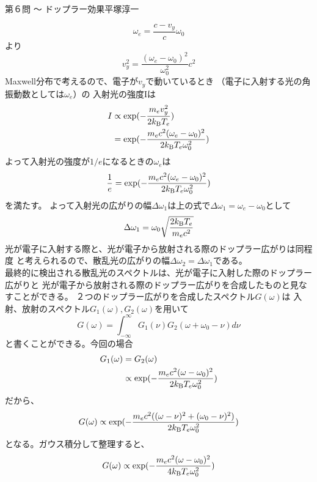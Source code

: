 \begin{answer}{第６問 〜 ドップラー効果}{平塚淳一}
\begin{enumerate}
\begin{equation}
  \omega_e=\frac{c-v_y}{c}\omega_0
  \end{equation}
  より
  \begin{equation}
  v^2_y=\frac{(\omega_e-\omega_0)^2}{\omega^2_0}c^2
  \end{equation}
  Maxwell分布で考えるので、電子が$v_y$で動いているとき
  （電子に入射する光の角振動数としては$\omega_e$）の
  入射光の強度Iは
  \begin{align}
  I &\propto \exp(-\frac{m_e v^2_y}{2k_{\mathrm B} T_e})\\
  &= \exp(-\frac{m_e c^2(\omega_e-\omega_0)^2}{2k_{\mathrm B} T_e \omega^2_0})
  \end{align}
  よって入射光の強度が$1/e$になるときの$\omega_e$は
  \begin{equation}
  \frac{1}{e}=\exp(-\frac{m_e c^2(\omega_e-\omega_0)^2}{2k_{\mathrm B} T_e \omega^2_0})
  \end{equation}
  を満たす。
  よって入射光の広がりの幅$\Delta \omega_1$は上の式で$\Delta \omega_1= \omega_e-\omega_0$として
  \begin{equation}
  \Delta \omega_1 = \omega_0\sqrt{\frac{2k_{\mathrm B} T_e}{m_ec^2}}
  \end{equation}
  光が電子に入射する際と、光が電子から放射される際のドップラー広がりは同程度
  と考えられるので、散乱光の広がりの幅$\Delta \omega_2=\Delta \omega_1$である。\\
  最終的に検出される散乱光のスペクトルは、光が電子に入射した際のドップラー広がりと
  光が電子から放射される際のドップラー広がりを合成したものと見なすことができる。
  ２つのドップラー広がりを合成したスペクトル$G(\omega)$は
  入射、放射のスペクトル$G_1(\omega),G_2(\omega)$を用いて
  \begin{equation}
  G(\omega)=\int^{\infty}_{-\infty}G_1(\nu)G_2(\omega+\omega_0-\nu)d\nu
  \end{equation}
  と書くことができる。今回の場合
  \begin{align}
  G_1(\omega)&=G_2(\omega)\\
  &\propto \exp(-\frac{m_e c^2(\omega-\omega_0)^2}{2k_{\mathrm B} T_e \omega^2_0})
  \end{align}
  だから、
  \begin{equation}
  G(\omega) \propto \exp(-\frac{m_e c^2((\omega-\nu)^2+(\omega_0-\nu)^2)}{2k_{\mathrm B} T_e \omega^2_0})
  \end{equation}
  となる。ガウス積分して整理すると、
  \begin{equation}
  G(\omega) \propto \exp(-\frac{m_e c^2(\omega-\omega_0)^2}{4k_{\mathrm B} T_e \omega^2_0})
  \end{equation}

\end{enumerate}
\end{answer}
